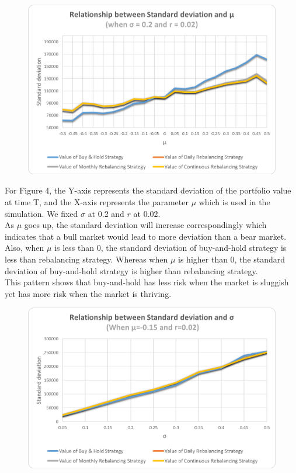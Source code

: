 \documentclass[
10pt, %
a4paper, %
oneside, %
headinclude,footinclude, %
BCOR5mm, %
]{scrartcl}
\begin{document}
\begin{figure}[H]
	\centering
	\includegraphics[width=0.7\linewidth]{std_mu_020_002}
	\caption{}
	\label{fig:stdmu020002}
\end{figure}
For Figure 4, the Y-axis represents the standard deviation of the portfolio value at time T, and the X-axis represents the parameter $\mu$ which is used in the simulation. We fixed $\sigma$ at 0.2 and $r$ at 0.02.\\

As $\mu$ goes up, the standard deviation will increase correspondingly which indicates that a bull market would lead to more deviation than a bear market.  Also, when $\mu$ is less than 0, the standard deviation of buy-and-hold strategy is less than rebalancing strategy. Whereas when $\mu$ is higher than 0, the standard deviation of buy-and-hold strategy is higher than rebalancing strategy.\\ 

This pattern shows that buy-and-hold has less risk when the market is sluggish yet has more risk when the market is thriving. \\

\begin{figure}[H]
	\centering
	\includegraphics[width=0.7\linewidth]{std_sigma_-015_002}
	\caption{}
	\label{fig:stdsigma-015002}
\end{figure}
\end{document}
